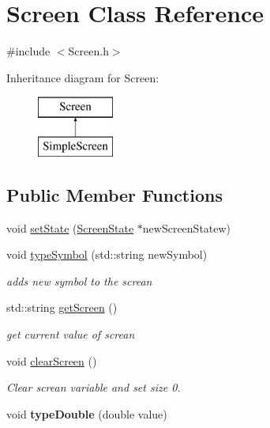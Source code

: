 \hypertarget{class_screen}{}\section{Screen Class Reference}
\label{class_screen}


{\ttfamily \#include $<$Screen.\+h$>$}

Inheritance diagram for Screen\+:\begin{figure}[H]
\begin{center}
\leavevmode
\includegraphics[height=2.000000cm]{class_screen}
\end{center}
\end{figure}
\subsection*{Public Member Functions}
\begin{DoxyCompactItemize}
\item 
void \hyperlink{class_screen_a77de1ee1d98d21bb8bab21e9f507c369}{set\+State} (\hyperlink{class_screen_state}{Screen\+State} $\ast$new\+Screen\+Statew)
\item 
void \hyperlink{class_screen_a43f495857effafe04848a91dfc229fbe}{type\+Symbol} (std\+::string new\+Symbol)
\begin{DoxyCompactList}\small\item\em adds new symbol to the screan \end{DoxyCompactList}\item 
std\+::string \hyperlink{class_screen_a82445b0bebdac598ab96fecdd362e387}{get\+Screen} ()
\begin{DoxyCompactList}\small\item\em get current value of screan \end{DoxyCompactList}\item 
\hypertarget{class_screen_ab8f41de38bab8a2a16eb40fb66af00f2}{}void \hyperlink{class_screen_ab8f41de38bab8a2a16eb40fb66af00f2}{clear\+Screen} ()\label{class_screen_ab8f41de38bab8a2a16eb40fb66af00f2}

\begin{DoxyCompactList}\small\item\em Clear screan variable and set size 0. \end{DoxyCompactList}\item 
\hypertarget{class_screen_a1ab0cbcdffb9e088ee5439d0bea82d2f}{}void {\bfseries type\+Double} (double value)\label{class_screen_a1ab0cbcdffb9e088ee5439d0bea82d2f}

\end{DoxyCompactItemize}

